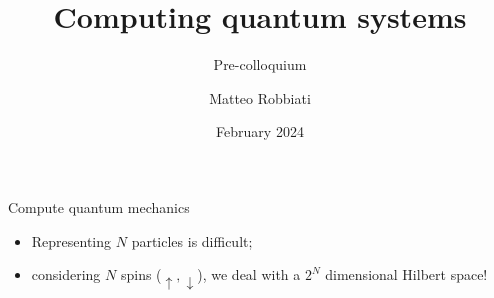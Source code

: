 \documentclass[8pt, xcolor={svgnames}, hyperref={linkcolor=amethyst}]{beamer}
\title{Computing quantum systems}
\subtitle{Pre-colloquium}
\date{February  2024}
\author[Matteo Robbiati]{Matteo Robbiati}
\begin{document}
\maketitle

\begin{frame}{Compute quantum mechanics}
\pause
  \begin{itemize}[noitemsep]
  \item<2,3>[\faGear] Representing $N$ particles is difficult;
  \item<3>[\faGears] considering $N$ spins ($\uparrow, \downarrow$), we deal with a $2^N$ dimensional Hilbert space!
  \end{itemize}
  \vspace{0.5cm}
  \begin{multicols}{2}
    \begin{figure}
    \end{figure}
    \begin{figure}
    \end{figure}
\end{multicols}
\end{frame}
\end{document}
